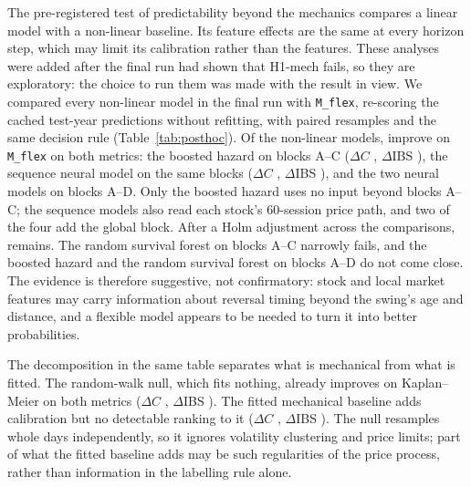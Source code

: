 The pre-registered test of predictability beyond the mechanics compares a linear model with a
non-linear baseline. Its feature effects are the same at every horizon step, which may limit its
calibration rather than the features. These analyses were added after the final run had shown
that H1-mech fails, so they are exploratory: the choice to run them was made with the result in
view. We compared every non-linear model in the final run with \texttt{M\_flex}, re-scoring the
cached test-year predictions without refitting, with \PHResamples{} paired resamples and the same
decision rule (Table~\ref{tab:posthoc}). Of the \PHLikeCount{} non-linear models, \PHLikePass{}
improve on \texttt{M\_flex} on both metrics: the boosted hazard on blocks A--C ($\Delta C$
\PHDCGbmABCMFlex, $\Delta$IBS \PHDIBSGbmABCMFlex), the sequence neural model on the same blocks
($\Delta C$ \PHDCNnSeqABCMFlex, $\Delta$IBS \PHDIBSNnSeqABCMFlex), and the two neural models on
blocks A--D. Only the boosted hazard uses no input beyond blocks A--C; the sequence models also read
each stock's 60-session price path, and two of the four add the global block. After a Holm
adjustment across the \PHLikeCount{} comparisons, \PHHolmPass{} remains. The random survival forest
on blocks A--C narrowly fails, and the boosted hazard and the random survival forest on blocks A--D
do not come close. The evidence is therefore suggestive, not confirmatory: stock and local market
features may carry information about reversal timing beyond the swing's age and distance, and a
flexible model appears to be needed to turn it into better probabilities.

The decomposition in the same table separates what is mechanical from what is fitted. The
random-walk null, which fits nothing, already improves on Kaplan--Meier on both metrics ($\Delta C$
\PHDCRWKm, $\Delta$IBS \PHDIBSRWKm). The fitted mechanical baseline adds calibration but no
detectable ranking to it ($\Delta C$ \PHDCMFlexRW, $\Delta$IBS \PHDIBSMFlexRW). The null resamples
whole days independently, so it ignores volatility clustering and price limits; part of what the
fitted baseline adds may be such regularities of the price process, rather than information in the
labelling rule alone.

\begin{table}[!htbp]
\centering
\caption{Post-hoc comparisons, test years 2017--2026, from the cached predictions of the final
run (no refitting). Paired differences with 95\% intervals from \PHResamples{} moving-block
resamples; ``Improves'' applies the decision rule of the primary tests, which requires
$p<0.025$ (both one-sided shares below 2.5\%). Interval bounds that print as 0.000 may lie on
either side of zero before rounding. $p$ is unadjusted; Holm $p$ adjusts across the \PHLikeCount{}
like-for-like comparisons.}\label{tab:posthoc}
\footnotesize
{}
\end{table}

